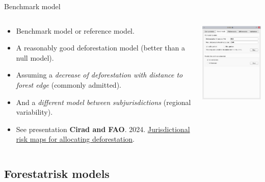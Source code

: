 \documentclass[10pt,table,dvipsnames,compress]{beamer}
\begin{document}
\begin{frame}[label={sec:org2e32298}]{Benchmark model}
\begin{columns}
\begin{column}{0.5\columnwidth}
\begin{itemize}
\item Benchmark model or reference model.
\item A reasonably good deforestation model (better than a null model).
\item Assuming a \emph{decrease of deforestation with distance to forest edge} (commonly admitted).
\item And a \emph{different model between subjurisdictions} (regional variability).
\item See presentation \textbf{Cirad and FAO}. 2024. \href{https://deforisk-qgis-plugin.org/\_static/references/Cirad2024-riskmap-verra.pdf}{Jurisdictional risk maps for allocating deforestation}.
\end{itemize}
\end{column}

\begin{column}{0.5\columnwidth}
\begin{center}
\includegraphics[width=5cm]{figs/plugin_api/interface_benchmark.png}
\end{center}  
\end{column}
\end{columns}
\end{frame}

\subsection{Forestatrisk models}
\label{sec:org63e7522}
\end{document}
